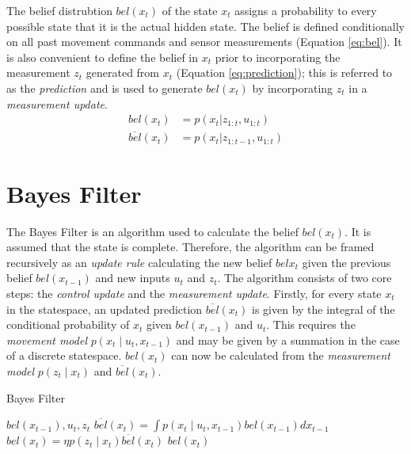 \documentclass[english]{article}
\begin{document}
The belief distrubtion $bel(x_t)$ of the state $x_t$ assigns a probability to every possible state that it is the actual hidden state. The belief is defined conditionally on all past movement commands and sensor measurements\cite{probrob} (Equation \ref{eq:bel}). It is also convenient to define the belief in $x_t$ prior to incorporating the measurement $z_t$ generated from $x_t$ (Equation \ref{eq:prediction}); this is referred to as the \emph{prediction} and is used to generate $bel(x_t)$ by incorporating $z_t$ in a \emph{measurement update}.
\begin {align}
  bel(x_t) & = p(x_t | z_{1:t},u_{1:t}) \label{eq:bel} \\   
  \overline{bel}(x_t) & = p(x_t | z_{1:t-1}, u_{1:t}) \label{eq:prediction}
\end {align}


\section*{Bayes Filter}
The Bayes Filter is an algorithm used to calculate the belief $bel(x_t)$. It is assumed that the state is complete. Therefore, the algorithm can be framed recursively as an \emph{update rule} calculating the new belief $bel{x_t}$ given the previous belief $bel(x_{t-1})$ and new inputs $u_t$ and $z_t$. The algorithm consists of two core steps: the \emph{control update} and the \emph{measurement update}. Firstly, for every state $x_t$ in the statespace, an updated prediction $\overline{bel}(x_t)$ is given by the integral of the conditional probability of $x_t$ given $bel(x_{t-1})$ and $u_t$\cite{probrob}. This requires the \emph{movement model} $p(x_t \mid u_t,x_{t-1})$ and may be given by a summation in the case of a discrete statespace. $bel(x_t)$ can now be calculated from the \emph{measurement model} $p(z_t \mid x_t)$ and $\overline{bel}(x_t)$.

\begin{algorithm}
\caption{Bayes Filter}
\label{alg:bayes}
\begin{algorithmic}
	\REQUIRE $bel(x_{t-1}), u_t, z_t$
        \STATE $\overline{bel}(x_t)  = \int p(x_t \mid u_t, x_{t-1})bel(x_{t-1}) dx_{t-1}$
        \STATE $bel(x_t)  = \eta p(z_t \mid x_t) \overline{bel}(x_t)$
        \ENDFOR
        \RETURN $bel(x_t)$
\end{algorithmic}
\end{algorithm}
\end{document}
